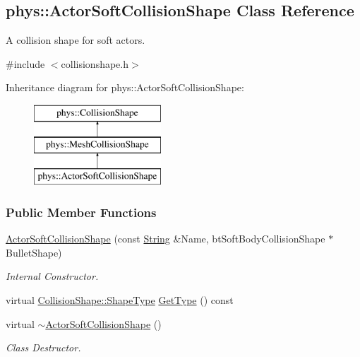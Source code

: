 \hypertarget{classphys_1_1ActorSoftCollisionShape}{
\subsection{phys::ActorSoftCollisionShape Class Reference}
\label{classphys_1_1ActorSoftCollisionShape}
}


A collision shape for soft actors.  




{\ttfamily \#include $<$collisionshape.h$>$}

Inheritance diagram for phys::ActorSoftCollisionShape:\begin{figure}[H]
\begin{center}
\leavevmode
\includegraphics[height=3.000000cm]{classphys_1_1ActorSoftCollisionShape}
\end{center}
\end{figure}
\subsubsection*{Public Member Functions}
\begin{DoxyCompactItemize}
\item 
\hyperlink{classphys_1_1ActorSoftCollisionShape_adc49756fc882212059947fde462fae4c}{ActorSoftCollisionShape} (const \hyperlink{namespacephys_aa03900411993de7fbfec4789bc1d392e}{String} \&Name, btSoftBodyCollisionShape $\ast$BulletShape)
\begin{DoxyCompactList}\small\item\em Internal Constructor. \item\end{DoxyCompactList}\item 
virtual \hyperlink{classphys_1_1CollisionShape_af3ba4fd8af5b9557f912d2f5ff35a588}{CollisionShape::ShapeType} \hyperlink{classphys_1_1ActorSoftCollisionShape_af7b284a89286ac1e0f90262f222faf09}{GetType} () const 
\item 
\hypertarget{classphys_1_1ActorSoftCollisionShape_aec375ca9a085f2e636ac9e28e4e8a042}{
virtual \hyperlink{classphys_1_1ActorSoftCollisionShape_aec375ca9a085f2e636ac9e28e4e8a042}{$\sim$ActorSoftCollisionShape} ()}
\label{classphys_1_1ActorSoftCollisionShape_aec375ca9a085f2e636ac9e28e4e8a042}

\begin{DoxyCompactList}\small\item\em Class Destructor. \item\end{DoxyCompactList}\end{DoxyCompactItemize}
